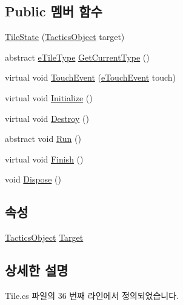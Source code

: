 \subsection*{Public 멤버 함수}
\begin{DoxyCompactItemize}
\item 
\hyperlink{class_tile_1_1_tile_state_a074f350ff6dd6d5456fdb800b9402952}{Tile\+State} (\hyperlink{class_tactics_object}{Tactics\+Object} target)
\item 
abstract \hyperlink{_tile_8cs_a271bc07be325bca511bcb747e0ff2fda}{e\+Tile\+Type} \hyperlink{class_tile_1_1_tile_state_a9649a2b7b7cb3ae49eb35df6b6eef43e}{Get\+Current\+Type} ()
\item 
virtual void \hyperlink{class_tile_1_1_tile_state_a3ddb7ad41bed1404287b6847dd4edf05}{Touch\+Event} (\hyperlink{_touch_manager_8cs_ae33e321a424fe84ba8b2fdb81ad40a68}{e\+Touch\+Event} touch)
\item 
virtual void \hyperlink{class_m_c_n_1_1_state_a5be59bc891e64cbbe4322d74a6746908}{Initialize} ()
\item 
virtual void \hyperlink{class_m_c_n_1_1_state_aebf48ef248bbf185d6aae91d9789459e}{Destroy} ()
\item 
abstract void \hyperlink{class_m_c_n_1_1_state_afdec72a816a8a8ec584cac758a027215}{Run} ()
\item 
virtual void \hyperlink{class_m_c_n_1_1_state_a2492ca731678b8216c02134dddeeb745}{Finish} ()
\item 
void \hyperlink{class_m_c_n_1_1_state_af6df0477e0dead784489688cb2c2093e}{Dispose} ()
\end{DoxyCompactItemize}
\subsection*{속성}
\begin{DoxyCompactItemize}
\item 
\hyperlink{class_tactics_object}{Tactics\+Object} \hyperlink{class_m_c_n_1_1_state_a79a563b32f183c9adc9a96679fc57eb8}{Target}
\end{DoxyCompactItemize}


\subsection{상세한 설명}


Tile.\+cs 파일의 36 번째 라인에서 정의되었습니다.



